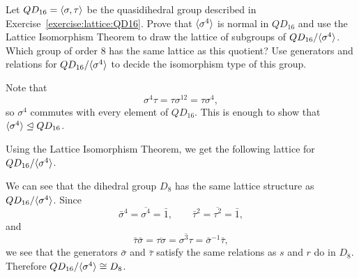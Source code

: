  Let $QD_{16} = \langle{\sigma,\tau}\rangle$ be the quasidihedral
group described in Exercise~\ref{exercise:lattice:QD16}. Prove that
$\langle{\sigma^4}\rangle$ is normal in $QD_{16}$ and use the Lattice
Isomorphism Theorem to draw the lattice of subgroups of
$QD_{16}/\langle{\sigma^4}\rangle$. Which group of order $8$ has the same
lattice as this quotient? Use generators and relations for
$QD_{16}/\langle{\sigma^4}\rangle$ to decide the isomorphism type of this group.
\begin{solution}
  Note that
  \begin{equation*}
    \sigma^4\tau = \tau\sigma^{12} = \tau\sigma^4,
  \end{equation*}
  so $\sigma^4$ commutes with every element of $QD_{16}$. This is
  enough to show that $\langle{\sigma^4}\rangle\trianglelefteq QD_{16}$.

  Using the Lattice Isomorphism Theorem, we get the following lattice
  for $QD_{16}/\langle{\sigma^4}\rangle$.
  \begin{center}
  \end{center}

  We can see that the dihedral group $D_8$ has the same lattice
  structure as $QD_{16}/\langle{\sigma^4}\rangle$. Since
  \begin{equation*}
    \bar\sigma^4 = \overline{\sigma^4} = \bar1,
    \qquad
    \bar\tau^2 = \overline{\tau^2} = \bar1,
  \end{equation*}
  and
  \begin{equation*}
    \bar\tau\bar\sigma = \overline{\tau\sigma}
    = \overline{\sigma^3\tau}
    = \bar\sigma^{-1}\bar\tau,
  \end{equation*}
  we see that the generators $\bar\sigma$ and $\bar\tau$ satisfy the
  same relations as $s$ and $r$ do in $D_8$. Therefore
  $QD_{16}/\langle{\sigma^4}\rangle\cong D_8$.
\end{solution}

